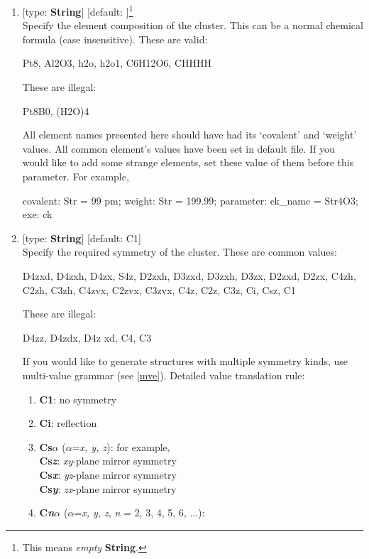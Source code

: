 \documentclass[11pt]{book}
\begin{document}
\begin{enumerate}
\item {} [type: \textbf{String}] [default: ]\footnote{This means \emph{empty} \textbf{String}.} \\
	Specify the element composition of the cluster. 
	This can be a normal chemical formula (case insensitive). These are valid:
\begin{everbatim}
Pt8, Al2O3, h2o, h2o1, C6H12O6, CHHHH
\end{everbatim}
	These are illegal:
\begin{everbatim}
Pt8B0, (H2O)4
\end{everbatim}
	All element names presented here should have had its `covalent' and `weight' values. All common element's values have been set
	in default file. If you would like to add some strange elements, set these value of them before this parameter. For example, 
\begin{everbatim}
{ covalent: Str = 99 pm; }
{ weight: Str = 199.99; }
{ parameter: ck_name = Str4O3; }
{ exe: ck }
\end{everbatim}
\item {} [type: \textbf{String}] [default: C1] \\
	Specify the required symmetry of the cluster.
	These are common values:
\begin{everbatim}
D4zxd, D4zxh, D4zx, S4z, 
D2zxh, D3zxd, D3zxh, D3zx, D2zxd, D2zx, 
C4zh, C2zh, C3zh, C4zvx, C2zvx, C3zvx, 
C4z, C2z, C3z, Ci, Csz, C1
\end{everbatim}
	These are illegal:
\begin{everbatim}
D4zz, D4zdx, D4z xd, C4, C3
\end{everbatim}
	If you would like to generate structures with multiple symmetry kinds, use multi-value grammar (see \ref{mve}).
	Detailed value translation rule:
	\begin{enumerate}
	\item \textbf{C1}: no symmetry
	\item \textbf{Ci}: reflection
	\item \textbf{Cs$\alpha$} ($\alpha$=\emph{x, y, z}): for example, \\
		\textbf{Cs\emph{z}}: \emph{xy}-plane mirror symmetry \\
		\textbf{Cs\emph{x}}: \emph{yz}-plane mirror symmetry \\
		\textbf{Cs\emph{y}}: \emph{zx}-plane mirror symmetry 
	\item \textbf{C\emph{n}$\alpha$} ($\alpha$=\emph{x, y, z}, \emph{n} = 2, 3, 4, 5, 6, ...): 

\end{enumerate}
\end{enumerate}
\end{document}
